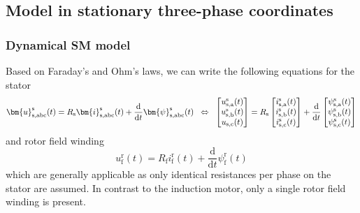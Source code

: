 \subsection{Model in stationary three-phase coordinates}

\begin{frame}
	\frametitle{Dynamical SM model}
	Based on Faraday's and Ohm's laws, we can write the following equations for the stator
	\begin{equation}
		\bm{u}^\mathrm{s}_\mathrm{s,abc}(t) = R_\mathrm{s}\bm{i}^\mathrm{s}_\mathrm{s,abc}(t)+\frac{\mathrm{d}}{\mathrm{d}t}\bm{\psi}^\mathrm{s}_\mathrm{s,abc}(t) \hspace{0.2cm} \Leftrightarrow \hspace{0.2cm} \begin{bmatrix}
			u_{\mathrm{s,a}}^\mathrm{s}(t) \\
			u_{\mathrm{s,b}}^\mathrm{s}(t) \\
			u_{\mathrm{s,c}}(t)            \\
		\end{bmatrix} = R_\mathrm{s} \begin{bmatrix}
			i_{\mathrm{s,a}}^\mathrm{s}(t) \\
			i_{\mathrm{s,b}}^\mathrm{s}(t) \\
			i_{\mathrm{s,c}}^\mathrm{s}(t) \\
		\end{bmatrix} + \frac{\mathrm{d}}{\mathrm{d}t} \begin{bmatrix}
			\psi_{\mathrm{s,a}}^\mathrm{s}(t) \\
			\psi_{\mathrm{s,b}}^\mathrm{s}(t) \\
			\psi_{\mathrm{s,c}}^\mathrm{s}(t) \\
		\end{bmatrix}
		\label{eq:SM_stator_three_phase_voltage_equation}
	\end{equation}
	\pause
	and rotor field winding
	\begin{equation}
		u^\mathrm{r}_\mathrm{f}(t) = R_\mathrm{f}i^\mathrm{r}_\mathrm{f}(t)+\frac{\mathrm{d}}{\mathrm{d}t}\psi^\mathrm{r}_\mathrm{f}(t)
		\label{eq:SM_rotor_voltage_equation}
	\end{equation}
	which are generally applicable as only identical resistances per phase on the stator are assumed. \pause In contrast to the induction motor, only a single rotor field winding is present.
\end{frame}

